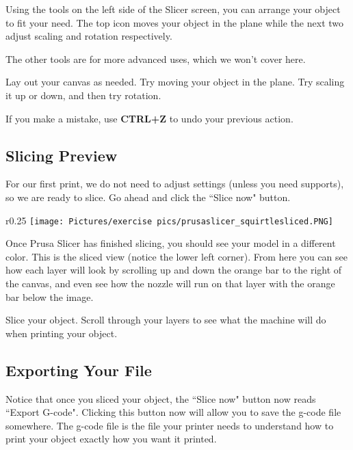 Using the tools on the left side of the Slicer screen, you can arrange your object to fit your need. The top icon moves your object in the plane while the next two adjust scaling and rotation respectively.

\noindent The other tools are for more advanced uses, which we won't cover here.

\begin{exercise}
Lay out your canvas as needed. Try moving your object in the plane. Try scaling it up or down, and then try rotation.
\end{exercise}

\begin{remark}
If you make a mistake, use \textbf{CTRL+Z} to undo your previous action.
\end{remark}

\subsection{Slicing Preview}

For our first print, we do not need to adjust settings (unless you need supports), so we are ready to slice. Go ahead and click the ``Slice now" button. 

\begin{wrapfigure}{r}{0.25\textwidth} %
    \centering
    \texttt{[image: Pictures/exercise pics/prusaslicer\_squirtlesliced.PNG]}
    \label{fig:prusaslicer_supports}
\end{wrapfigure}

\noindent Once Prusa Slicer has finished slicing, you should see your model in a different color. This is the sliced view (notice the lower left corner). From here you can see how each layer will look by scrolling up and down the orange bar to the right of the canvas, and even see how the nozzle will run on that layer with the orange bar below the image.

\begin{exercise}
Slice your object. Scroll through your layers to see what the machine will do when printing your object.
\end{exercise}

\subsection{Exporting Your File}

Notice that once you sliced your object, the ``Slice now" button now reads ``Export G-code". Clicking this button now will allow you to save the g-code file somewhere. The g-code file is the file your printer needs to understand how to print your object exactly how you want it printed. 

